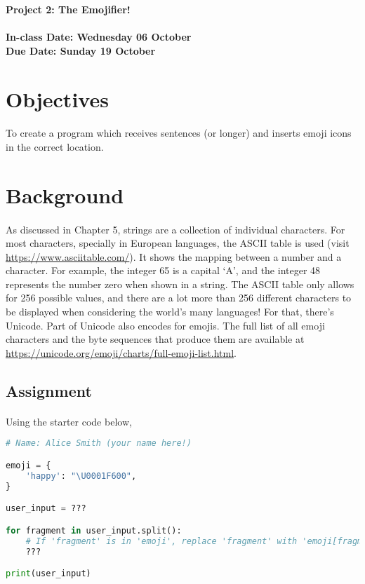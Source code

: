 \documentclass[letter,10pt]{article}
\begin{document}
    
    \huge
    \textbf{Project 2: The Emojifier!}
    \normalsize
    \\ ~~ \\
    \textbf{In-class Date: Wednesday 06 October} \\
    \textbf{Due Date: Sunday 19 October}
    
    \section*{Objectives}
    \paragraph{}To create a program which receives sentences (or longer) and inserts emoji icons in the correct location.
    
    \section*{Background}
    \paragraph{}As discussed in Chapter 5, strings are a collection of individual characters. For most characters, specially in European languages, the ASCII table is used (visit \url{https://www.asciitable.com/}). It shows the mapping between a number and a character. For example, the integer 65 is a capital `A', and the integer 48 represents the number zero when shown in a string. The ASCII table only allows for 256 possible values, and there are a lot more than 256 different characters to be displayed when considering the world's many languages! For that, there's Unicode. Part of Unicode also encodes for emojis. The full list of all emoji characters and the byte sequences that produce them are available at \url{https://unicode.org/emoji/charts/full-emoji-list.html}.
    
    \subsection*{Assignment}
    \paragraph{}Using the starter code below, 
    
    \begin{lstlisting}[language=python]
# Name: Alice Smith (your name here!)

emoji = {
    'happy': "\U0001F600",
}

user_input = ???

for fragment in user_input.split():
    # If 'fragment' is in 'emoji', replace 'fragment' with 'emoji[fragment]'
    ???

print(user_input)
    \end{lstlisting}
\end{document}

